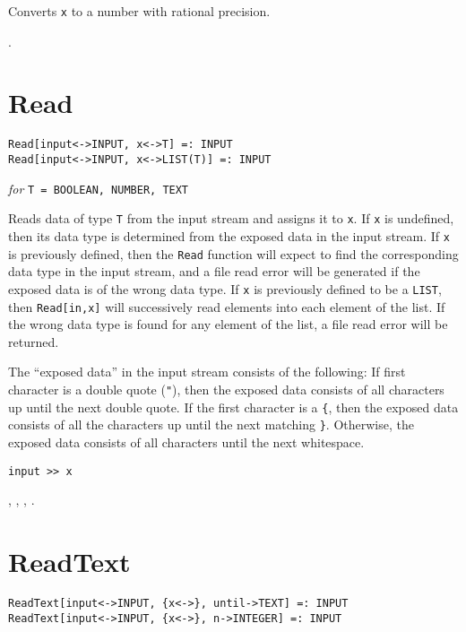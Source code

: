 \noindent
Converts \texttt{x} to a number with rational precision.

\seealso {}.


\section*{Read}\label{PrimRead}
\begin{verbatim}
Read[input<->INPUT, x<->T] =: INPUT 
Read[input<->INPUT, x<->LIST(T)] =: INPUT
\end{verbatim}
\textit{for} \texttt{T = BOOLEAN, NUMBER, TEXT}

\noindent
Reads data of type \verb+T+ from the input stream and assigns it to
\verb+x+.  If \verb+x+ is undefined, then its data type is determined
from the exposed data in the input stream.  If \verb+x+ is previously
defined, then the \verb+Read+ function will expect to find the
corresponding data type in the input stream, and a file read error
will be generated if the exposed data is of the wrong data type.  If
\verb+x+ is previously defined to be a \verb+LIST+, then \verb+Read[in,x]+
will successively read elements into each element of the list.  If the
wrong data type is found for any element of the list, a file read
error will be returned.

\noindent
The ``exposed data'' in the input stream consists of the following: If
first character is a double quote (\verb+"+), then the exposed data
consists of all characters up until the next double quote.  If the
first character is a \verb+{+, then the exposed data consists of all
the characters up until the next matching \verb+}+.  Otherwise, the
exposed data consists of all characters until the next whitespace.

\shortform \texttt{input >> x}

\seealso {}, ,
, .


\section*{ReadText}\label{PrimReadText}
\begin{verbatim}
ReadText[input<->INPUT, {x<->}, until->TEXT] =: INPUT
ReadText[input<->INPUT, {x<->}, n->INTEGER] =: INPUT
\end{verbatim}

